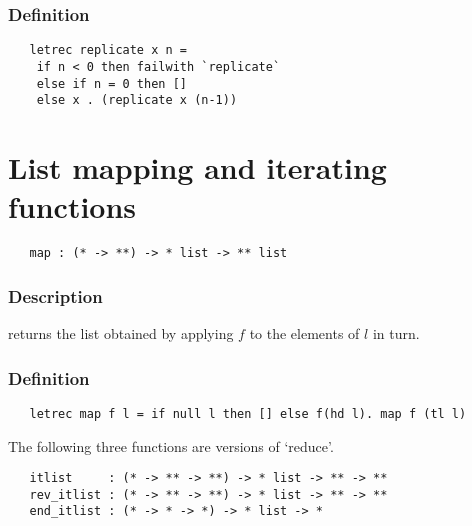 \subsubsection*{Definition}

\begin{hol}\begin{verbatim}
   letrec replicate x n =
    if n < 0 then failwith `replicate`
    else if n = 0 then []
    else x . (replicate x (n-1))
\end{verbatim}\end{hol}


\section{List mapping and iterating functions}

\begin{boxed}
\begin{verbatim}
   map : (* -> **) -> * list -> ** list
\end{verbatim}\end{boxed}

\subsubsection*{Description} 

 returns the list obtained by
applying $f$ to the elements of $l$ in turn.

\subsubsection*{Definition}

\begin{hol}\begin{verbatim}
   letrec map f l = if null l then [] else f(hd l). map f (tl l)
\end{verbatim}\end{hol}


\noindent The following three functions are versions of `reduce'.

\begin{boxed}
\begin{verbatim}
   itlist     : (* -> ** -> **) -> * list -> ** -> **
   rev_itlist : (* -> ** -> **) -> * list -> ** -> **
   end_itlist : (* -> * -> *) -> * list -> *
\end{verbatim}\end{boxed}

